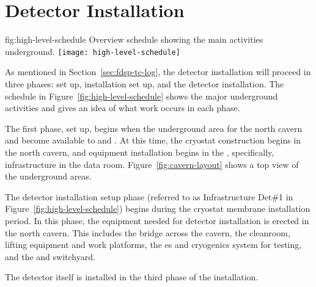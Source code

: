 \section{Detector Installation}
\label{sec:fdsp-tc-inst}





\begin{dunefigure}{fig:high-level-schedule}
  {Overview schedule showing the main activities underground.
  }
\texttt{[image: high-level-schedule]}
\end{dunefigure}



As mentioned in Section~\ref{sec:fdsp-tc-log}, the  detector installation will proceed in three phases:  set up, installation set up, and the detector installation. The schedule in Figure~\ref{fig:high-level-schedule} shows the major underground activities and gives an idea of what work occurs in each phase. 

The first phase,  set up, %
begins when the underground area for the north cavern and  %
become available to  and . At this time, the  cryostat construction %
begins in the north cavern, and  equipment installation %
begins in the , specifically, infrastructure in the  data room. Figure~\ref{fig:cavern-layout} shows a top view of the underground areas. %

The detector installation setup phase (referred to as Infrastructure Det\#1 in Figure~\ref{fig:high-level-schedule}) begins during the cryostat membrane installation period. 
In this phase, the equipment needed for detector installation is erected in the north cavern. This includes the bridge across the cavern, the cleanroom, lifting equipment and work platforms, the \coldbox{}es and cryogenics system for  testing, and the  and switchyard. 

The detector itself is installed in the third phase of the installation. 

